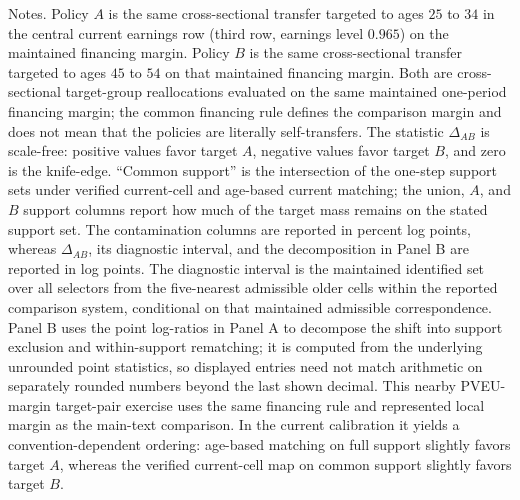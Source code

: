 \begin{table}[t]
\begin{minipage}{0.98\textwidth}
\footnotesize Notes. Policy $A$ is the same cross-sectional transfer targeted to ages $25$ to $34$ in the central current earnings row (third row, earnings level $0.965$) on the maintained financing margin. Policy $B$ is the same cross-sectional transfer targeted to ages $45$ to $54$ on that maintained financing margin. Both are cross-sectional target-group reallocations evaluated on the same maintained one-period financing margin; the common financing rule defines the comparison margin and does not mean that the policies are literally self-transfers. The statistic $\Delta_{AB}$ is scale-free: positive values favor target $A$, negative values favor target $B$, and zero is the knife-edge. ``Common support'' is the intersection of the one-step support sets under verified current-cell and age-based current matching; the union, $A$, and $B$ support columns report how much of the target mass remains on the stated support set. The contamination columns are reported in percent log points, whereas $\Delta_{AB}$, its diagnostic interval, and the decomposition in Panel B are reported in log points. The diagnostic interval is the maintained identified set over all selectors from the five-nearest admissible older cells within the reported comparison system, conditional on that maintained admissible correspondence. Panel B uses the point log-ratios in Panel A to decompose the shift into support exclusion and within-support rematching; it is computed from the underlying unrounded point statistics, so displayed entries need not match arithmetic on separately rounded numbers beyond the last shown decimal. This nearby PVEU-margin target-pair exercise uses the same financing rule and represented local margin as the main-text comparison. In the current calibration it yields a convention-dependent ordering: age-based matching on full support slightly favors target $A$, whereas the verified current-cell map on common support slightly favors target $B$.
\end{minipage}
\end{table}
